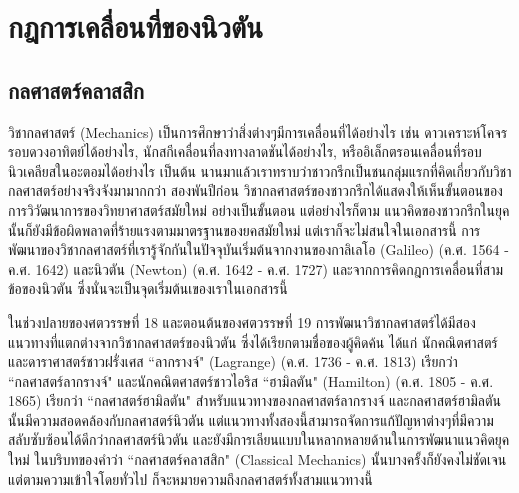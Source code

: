 \renewcommand{\theequation}{\thechapter.\arabic{equation}}

\chapter{กฎการเคลื่อนที่ของนิวตัน}
\label{Chapter:NewtonLaw}
\renewcommand{\thesection}{\thechapter.\arabic{section}}
\renewcommand{\theequation}{\thesection.\arabic{equation}}





\section{กลศาสตร์คลาสสิก}
\label{Sec:ClassicalMechanics}

วิชากลศาสตร์ (Mechanics) เป็นการศึกษาว่าสิ่งต่างๆมีการเคลื่อนที่ได้อย่างไร เช่น ดาวเคราะห์โคจรรอบดวงอาทิตย์ได้อย่างไร, นักสกีเคลื่อนที่ลงทางลาดชันได้อย่างไร, หรืออิเล็กตรอนเคลื่อนที่รอบนิวเคลียสในอะตอมได้อย่างไร เป็นต้น นานมาแล้วเราทราบว่าชาวกรีกเป็นชนกลุ่มแรกที่คิดเกี่ยวกับวิชากลศาสตร์อย่างจริงจังมามากกว่า
สองพันปีก่อน วิชากลศาสตร์ของชาวกรีกได้แสดงให้เห็นขั้นตอนของการวิวัฒนาการของวิทยาศาสตร์สมัยใหม่
อย่างเป็นขั้นตอน แต่อย่างไรก็ตาม แนวคิดของชาวกรีกในยุคนั้นก็ยังมีข้อผิดพลาดที่ร้ายแรงตามมาตรฐานของยคสมัยใหม่ แต่เราก็จะไม่สนใจในเอกสารนี้ การพัฒนาของวิชากลศาสตร์ที่เรารู้จักกันในปัจจุบันเริ่มต้นจากงานของกาลิเลโอ (Galileo) (ค.ศ. 1564 - ค.ศ. 1642) และนิวตัน (Newton) (ค.ศ. 1642 - ค.ศ. 1727) และจากการคิดกฎการเคลื่อนที่สามข้อของนิวตัน ซึ่งนั่นจะเป็นจุดเริ่มต้นเของเราในเอกสารนี้

ในช่วงปลายของศตวรรษที่ 18 และตอนต้นของศตวรรษที่ 19 การพัฒนาวิชากลศาสตร์ได้มีสองแนวทางที่แตกต่างจากวิชากลศาสตร์ของนิวตัน ซึ่งได้เรียกตามชื่อของผู้คิดค้น ได้แก่ นักคณิตศาสตร์และดาราศาสตร์ชาวฝรั่งเศส ``ลากรางจ์" (Lagrange) (ค.ศ. 1736 - ค.ศ. 1813) เรียกว่า ``กลศาสตร์ลากรางจ์" และนักคณิตศาสตร์ชาวไอริส ``ฮามิลตัน" (Hamilton) (ค.ศ. 1805 - ค.ศ. 1865) เรียกว่า ``กลศาสตร์ฮามิลตัน" สำหรับแนวทางของกลศาสตร์ลากรางจ์ และกลศาสตร์ฮามิลตันนั้นมีความสอดคล้องกับกลศาสตร์นิวตัน
 แต่แนวทางทั้งสองนี้สามารถจัดการแก้ปัญหาต่างๆที่มีความสลับซับซ้อนได้ดีกว่ากลศาสตร์นิวตัน และยังมีการเลียนแบบในหลากหลายด้านในการพัฒนาแนวคิดยุคใหม่ ในบริบทของคำว่า ``กลศาสตร์คลาสสิก" (Classical Mechanics) นั้นบางครั้งก็ยังคงไม่ชัดเจน แต่ตามความเข้าใจโดยทั่วไป ก็จะหมายความถึงกลศาสตร์ทั้งสามแนวทางนี้

